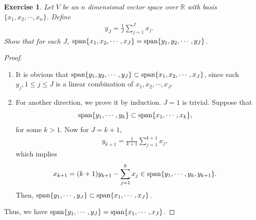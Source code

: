 \documentclass[11pt]{book}
\newtheorem{exercise}{Exercise}[section]
\theoremstyle{definition}
\numberwithin{equation}{chapter}
\begin{document}
\medskip

\begin{exercise}
Let $V$ be an $n$ dimensional vector space over $\mathbb{R}$ with basis $\{x_1, x_2, \cdots, x_n\}$. Define 
\begin{align*}
    y_J = \frac{1}{J} \sum^J_{j=1} x_j.
\end{align*}
Show that for each $J$, ${\rm span} \{x_1, x_2, \cdots, x_J\} = {\rm span} \{y_1, y_2, \cdots, y_J\}$.
\end{exercise}
\begin{proof}
~\begin{enumerate}[label=(\alph*)]
    \item It is obvious that ${\rm span} \{y_1, y_2, \cdots, y_J\} \subset {\rm span} \{x_1, x_2, \cdots, x_J\}$, since each $y_j, 1 \leq j \leq J$ is a linear combination of $x_1, x_2, \cdots, x_J$.
    
    \item For another direction, we prove it by induction. $J = 1$ is trivial. Suppose that $${\rm span} \{y_1, \cdots, y_k\} \subset {\rm span} \{x_1, \cdots, x_k\},$$ 
    for some $k > 1$. Now for $J = k + 1$, 
    \begin{align*}
        y_{k+1} = \frac{1}{k+1} \sum^{k+1}_{j=1} x_j,
    \end{align*}
    which implies
    \begin{align*}
        x_{k+1} = (k+1) y_{k+1} - \sum^k_{j=1} x_j \in {\rm span} \{y_1, \cdots, y_k, y_{k+1}\}.
    \end{align*}
    Then, ${\rm span} \{y_1, \cdots, y_J\} \subset {\rm span} \{x_1, \cdots, x_J\}$.
\end{enumerate}
Thus, we have ${\rm span} \{y_1, \cdots, y_J\} = {\rm span} \{x_1, \cdots, x_J\}$.
\end{proof}

\medskip
\end{document}
